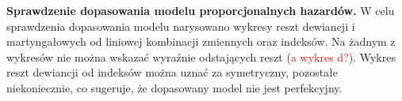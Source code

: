 \documentclass[]{article}
\begin{document}
\newpage
\textbf{Sprawdzenie dopasowania modelu proporcjonalnych hazardów.}
\newline
W celu sprawdzenia dopasowania modelu narysowano wykresy reszt
dewiancji i martyngałowych od liniowej kombinacji zmiennych oraz indeksów. Na
żadnym z wykresów nie można wskazać wyraźnie odstających reszt
(\textcolor{red}{a wykres d?}). Wykres reszt dewiancji od indeksów można
uznać za symetryczny, pozostałe niekoniecznie, co sugeruje, że
dopasowany model nie jest perfekcyjny.

\begin{figure}[hbt!]
  \vspace{-10pt}
  \begin{center}

\end{center}
\end{figure}
\end{document}
